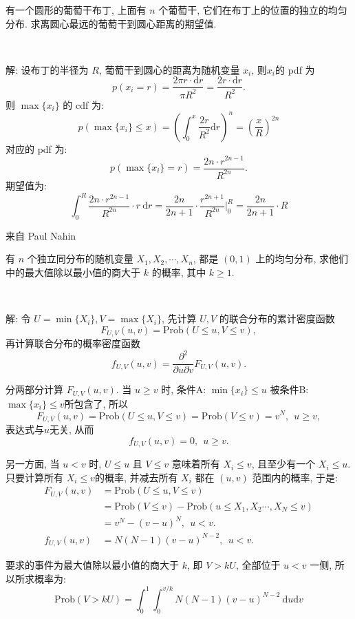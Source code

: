 有一个圆形的葡萄干布丁, 上面有 $n$ 个葡萄干, 它们在布丁上的位置的独立的均匀分布. 求离圆心最远的葡萄干到圆心距离的期望值.

~

解: 设布丁的半径为 $R$, 葡萄干到圆心的距离为随机变量 $x_i$, 则$x_i$的 pdf 为
\[p(x_i=r) = \frac{2\pi r\cdot\mathrm{d}r}{\pi R^2} = \frac{2r\cdot\mathrm{d}r}{R^2}.\]
则 $\max\{x_i\}$ 的 cdf 为:
\[p(\max\{x_i\} \le x) = \left( \int_0^x{\frac{2r}{R^2} \mathrm{d}r}\right)^n = \left(\frac{x}{R}\right)^{2n}\]
对应的 pdf 为: 
\[p(\max\{x_i\} = r) = \frac{2n\cdot r^{2n-1}}{R^{2n}} .\]
期望值为:
\[\int_0^R{\frac{2n\cdot r^{2n-1}}{R^{2n}}\cdot r}\ \mathrm{d}r = \frac{2n}{2n+1}\cdot \frac{r^{2n+1}}{R^{2n}}\bigg|_0^R = \frac{2n}{2n+1}\cdot R\]



\newpage

\noindent 来自 Paul Nahin

有 $n$ 个独立同分布的随机变量 $X_1, X_2, \cdots, X_n$, 都是 $(0,1)$ 上的均匀分布, 求他们中的最大值除以最小值的商大于 $k$ 的概率, 其中 $k \ge 1$.

~

解: 令 $U = \min\{X_i\}, V = \max\{X_i\}$, 先计算 $U,V$ 的联合分布的累计密度函数 
$$F_{U,V}(u,v) = \mathrm{Prob}(U\le u, V\le v) ,$$ 
再计算联合分布的概率密度函数 
$$f_{U,V}(u,v) = \frac{\partial^2}{\partial u\partial v}F_{U,V}(u,v). $$

分两部分计算 $F_{U,V}(u,v)$. 当 $u\ge v$ 时, 条件A: $\min\{x_i\}\le u$ 被条件B: $\max\{x_i\}\le v$所包含了, 所以 
$$F_{U,V}(u,v) = \mathrm{Prob}(U\le u, V\le v) = \mathrm{Prob}(V\le v) = v^N,\ \ u\ge v , $$ 
表达式与$u$无关, 从而
$$f_{U,V}(u,v) = 0,\ \ u\ge v .$$

另一方面, 当 $u < v$ 时, $U\le u$ 且 $V\le v$ 意味着所有 $X_i \le v$, 且至少有一个 $X_i \le u$. 只要计算所有 $X_i \le v$的概率, 并减去所有 $X_i$ 都在 $(u,v)$ 范围内的概率, 于是:
\begin{align*}
F_{U,V}(u,v) &= \mathrm{Prob}(U\le u, V\le v) \\
&= \mathrm{Prob}(V\le v) - \mathrm{Prob}(u\le X_1,X_2\cdots,X_N\le v) \\
&= v^N - (v-u)^N,\ \ u < v.\\
f_{U,V}(u,v) &= N(N-1)(v-u)^{N-2}, \ \ u < v.
\end{align*}

要求的事件为最大值除以最小值的商大于 $k$, 即 $V > kU$, 全部位于 $u<v$ 一侧, 所以所求概率为:
\[
\mathrm{Prob}(V > kU) = \int_0^1\int_0^{v/k}{N(N-1)(v-u)^{N-2}}\ \mathrm{d}u\mathrm{d}v
\]

